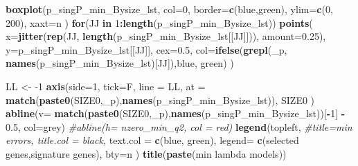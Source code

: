 \documentclass[
]{book}
\newenvironment{Shaded}{\begin{snugshade}}{\end{snugshade}}
\newcommand{\CommentTok}[1]{\textcolor[rgb]{0.56,0.35,0.01}{\textit{#1}}}
\newcommand{\ControlFlowTok}[1]{\textcolor[rgb]{0.13,0.29,0.53}{\textbf{#1}}}
\newcommand{\DataTypeTok}[1]{\textcolor[rgb]{0.13,0.29,0.53}{#1}}
\newcommand{\DecValTok}[1]{\textcolor[rgb]{0.00,0.00,0.81}{#1}}
\newcommand{\FloatTok}[1]{\textcolor[rgb]{0.00,0.00,0.81}{#1}}
\newcommand{\KeywordTok}[1]{\textcolor[rgb]{0.13,0.29,0.53}{\textbf{#1}}}
\newcommand{\NormalTok}[1]{#1}
\newcommand{\OperatorTok}[1]{\textcolor[rgb]{0.81,0.36,0.00}{\textbf{#1}}}
\newcommand{\StringTok}[1]{\textcolor[rgb]{0.31,0.60,0.02}{#1}}
\begin{document}
\begin{Shaded}
\begin{Highlighting}[]
\KeywordTok{boxplot}\NormalTok{(p\_singP\_min\_Bysize\_lst,}
  \DataTypeTok{col=}\DecValTok{0}\NormalTok{,}
  \DataTypeTok{border=}\KeywordTok{c}\NormalTok{(}\StringTok{\textquotesingle{}blue\textquotesingle{}}\NormalTok{,}\StringTok{\textquotesingle{}green\textquotesingle{}}\NormalTok{),}
  \DataTypeTok{ylim=}\KeywordTok{c}\NormalTok{(}\DecValTok{0}\NormalTok{, }\DecValTok{200}\NormalTok{),}
  \DataTypeTok{xaxt=}\StringTok{\textquotesingle{}n\textquotesingle{}}
\NormalTok{)}
\ControlFlowTok{for}\NormalTok{(JJ }\ControlFlowTok{in} \DecValTok{1}\OperatorTok{:}\KeywordTok{length}\NormalTok{(p\_singP\_min\_Bysize\_lst))}
\KeywordTok{points}\NormalTok{(}
   \DataTypeTok{x=}\KeywordTok{jitter}\NormalTok{(}\KeywordTok{rep}\NormalTok{(JJ, }\KeywordTok{length}\NormalTok{(p\_singP\_min\_Bysize\_lst[[JJ]])), }\DataTypeTok{amount=}\FloatTok{0.25}\NormalTok{),}
   \DataTypeTok{y=}\NormalTok{p\_singP\_min\_Bysize\_lst[[JJ]], }\DataTypeTok{cex=}\FloatTok{0.5}\NormalTok{,}
   \DataTypeTok{col=}\KeywordTok{ifelse}\NormalTok{(}\KeywordTok{grepl}\NormalTok{(}\StringTok{\textquotesingle{}\_p\textquotesingle{}}\NormalTok{, }\KeywordTok{names}\NormalTok{(p\_singP\_min\_Bysize\_lst)[JJ]),}\StringTok{\textquotesingle{}blue\textquotesingle{}}\NormalTok{, }\StringTok{\textquotesingle{}green\textquotesingle{}}\NormalTok{)}
\NormalTok{)}

\NormalTok{LL <{-}}\StringTok{ }\DecValTok{{-}1}
\KeywordTok{axis}\NormalTok{(}\DataTypeTok{side=}\DecValTok{1}\NormalTok{, }\DataTypeTok{tick=}\NormalTok{F, }\DataTypeTok{line =}\NormalTok{ LL,}
  \DataTypeTok{at =} \KeywordTok{match}\NormalTok{(}\KeywordTok{paste0}\NormalTok{(SIZE0,}\StringTok{\textquotesingle{}\_p\textquotesingle{}}\NormalTok{),}\KeywordTok{names}\NormalTok{(p\_singP\_min\_Bysize\_lst)),}
\NormalTok{  SIZE0}
\NormalTok{ )}
\KeywordTok{abline}\NormalTok{(}\DataTypeTok{v=} \KeywordTok{match}\NormalTok{(}\KeywordTok{paste0}\NormalTok{(SIZE0,}\StringTok{\textquotesingle{}\_p\textquotesingle{}}\NormalTok{),}\KeywordTok{names}\NormalTok{(p\_singP\_min\_Bysize\_lst))[}\OperatorTok{{-}}\DecValTok{1}\NormalTok{] }\OperatorTok{{-}}\StringTok{ }\FloatTok{0.5}\NormalTok{, }\DataTypeTok{col=}\StringTok{\textquotesingle{}grey\textquotesingle{}}\NormalTok{)}
\CommentTok{\#abline(h= nzero\_min\_q2, col = \textquotesingle{}red\textquotesingle{})}
\KeywordTok{legend}\NormalTok{(}\StringTok{\textquotesingle{}topleft\textquotesingle{}}\NormalTok{,}
   \CommentTok{\#title=\textquotesingle{}min errors\textquotesingle{}, title.col = \textquotesingle{}black\textquotesingle{},}
   \DataTypeTok{text.col =} \KeywordTok{c}\NormalTok{(}\StringTok{\textquotesingle{}blue\textquotesingle{}}\NormalTok{, }\StringTok{\textquotesingle{}green\textquotesingle{}}\NormalTok{),}
   \DataTypeTok{legend=} \KeywordTok{c}\NormalTok{(}\StringTok{\textquotesingle{}selected genes\textquotesingle{}}\NormalTok{,}\StringTok{\textquotesingle{}signature genes\textquotesingle{}}\NormalTok{),}
   \DataTypeTok{bty=}\StringTok{\textquotesingle{}n\textquotesingle{}}
\NormalTok{ )}
\KeywordTok{title}\NormalTok{(}\KeywordTok{paste}\NormalTok{(}\StringTok{\textquotesingle{}min lambda models\textquotesingle{}}\NormalTok{))}


\end{Highlighting}
\end{Shaded}
\end{document}
